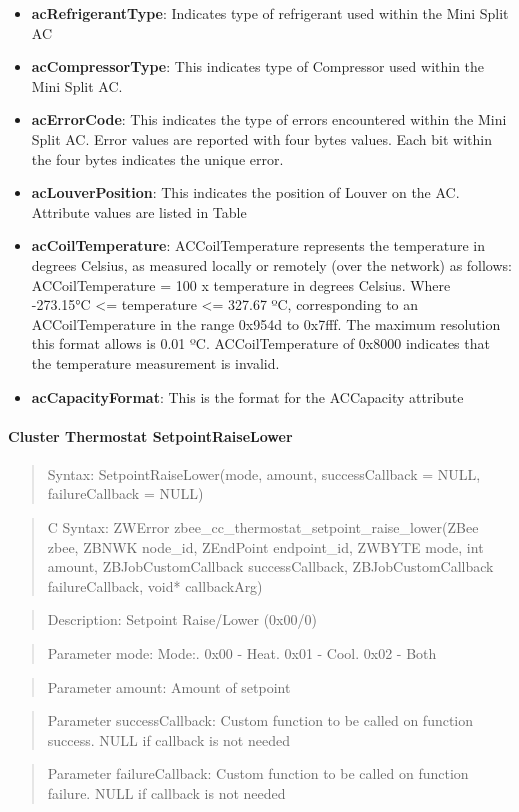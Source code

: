 \begin{itemize}
\item \textbf{acRefrigerantType}: Indicates type of refrigerant used within the Mini Split AC
\item \textbf{acCompressorType}: This indicates type of Compressor used within the Mini Split AC.
\item \textbf{acErrorCode}: This indicates the type of errors encountered within the Mini Split AC. Error values are reported with four bytes values. Each bit within the four bytes indicates the unique error.
\item \textbf{acLouverPosition}: This indicates the position of Louver on the AC. Attribute values are listed in Table
\item \textbf{acCoilTemperature}: ACCoilTemperature represents the temperature in degrees Celsius, as measured locally or remotely (over the network) as follows: ACCoilTemperature = 100 x temperature in degrees Celsius. Where -273.15°C <= temperature <= 327.67 ºC, corresponding to an ACCoilTemperature in the range 0x954d to 0x7fff. The maximum resolution this format allows is 0.01 ºC. ACCoilTemperature of 0x8000 indicates that the temperature measurement is invalid.
\item \textbf{acCapacityFormat}: This is the format for the ACCapacity attribute
\end{itemize}

\paragraph{Cluster Thermostat SetpointRaiseLower}
\begin{quote}Syntax: SetpointRaiseLower(mode, amount, successCallback = NULL, failureCallback = NULL)\end{quote}
\begin{quote}C Syntax: ZWError zbee\_cc\_thermostat\_setpoint\_raise\_lower(ZBee zbee, ZBNWK node\_id, ZEndPoint endpoint\_id, ZWBYTE mode, int amount, ZBJobCustomCallback successCallback, ZBJobCustomCallback failureCallback, void* callbackArg)\end{quote}
\begin{quote}Description: Setpoint Raise/Lower (0x00/0)\end{quote}
\begin{quote}Parameter mode: Mode:. 0x00 - Heat. 0x01 - Cool. 0x02 - Both\end{quote}
\begin{quote}Parameter amount: Amount of setpoint\end{quote}
\begin{quote}Parameter successCallback: Custom function to be called on function success. NULL if callback is not needed\end{quote}
\begin{quote}Parameter failureCallback: Custom function to be called on function failure. NULL if callback is not needed\end{quote}


